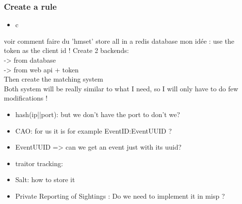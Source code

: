 \documentclass[10pt]{article}
\begin{document}
\subsubsection{Create a rule}
\begin{itemize}
\item c
\end{itemize}

voir comment faire du 'hmset' store all in a redis database
mon idée : 
use the token as the client id !
Create 2 backends:\\
-> from  database \\
-> from web api + token\\

Then create the matching system\\

Both system will be really similar to what I need, so I will only have to do few modifications ! 



\begin{itemize}
\item hash(ip||port): but we don't have the port to don't we?
\item CAO: for us it is for example EventID:EventUUID ?
\item EventUUID => can we get an event just with its uuid?
\item traitor tracking: 
\item Salt: how to store it 
\item Private Reporting of Sightings : Do we need to implement it in misp ?
\end{itemize}


\newpage


\end{document}
